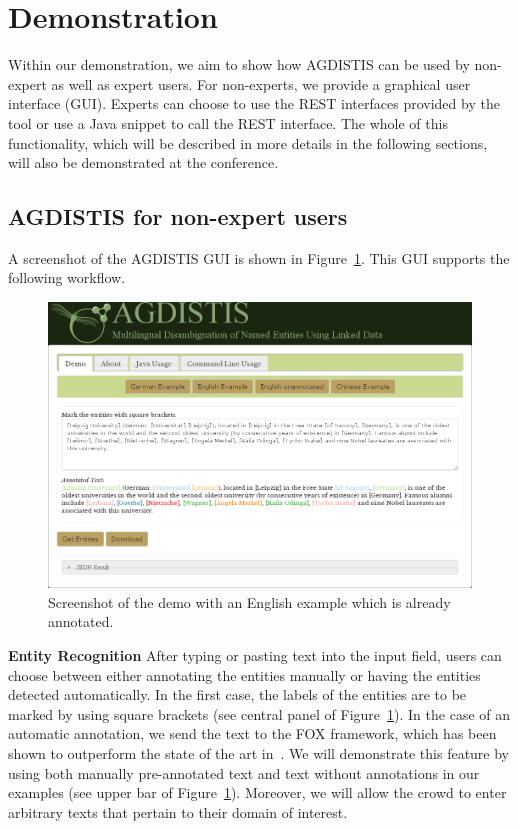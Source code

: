  
 
\section{Demonstration}
Within our demonstration, we aim to show how AGDISTIS can be used by non-expert as well as expert users.
For non-experts, we provide a graphical user interface (GUI).
Experts can choose to use the REST interfaces provided by the tool or use a Java snippet to call the REST interface.
The whole of this functionality, which will be described in more details in the following sections, will also be demonstrated at the conference.

\subsection{AGDISTIS for non-expert users}
A screenshot of the AGDISTIS GUI is shown in Figure~\ref{fig:gui}.
This GUI supports the following workflow.

\begin{figure}
\centering
\includegraphics[width=\textwidth]{chapter_three/unstructured_annotation/fig/GUI.png}
\caption{Screenshot of the demo with an English example which is already annotated.}
\label{fig:gui}
\end{figure}

\noindent\textbf{Entity Recognition}
After typing or pasting text into the input field, users can choose between either annotating the entities manually or having the entities detected automatically.
In the first case, the labels of the entities are to be marked by using square brackets (see central panel of Figure~\ref{fig:gui}).
In the case of an automatic annotation, we send the text to the FOX framework, which has been shown to outperform the state of the art in~\cite{FOX}.
We will demonstrate this feature by using both manually pre-annotated text and text without annotations in our examples (see upper bar of Figure~\ref{fig:gui}).
Moreover, we will allow the crowd to enter arbitrary texts that pertain to their domain of interest.

